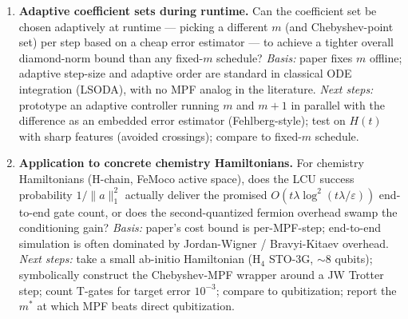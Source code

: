 \begin{enumerate}
  \item \textbf{Adaptive coefficient sets during runtime.} Can the coefficient set be chosen adaptively at runtime --- picking a different $m$ (and Chebyshev-point set) per step based on a cheap error estimator --- to achieve a tighter overall diamond-norm bound than any fixed-$m$ schedule? \emph{Basis:} paper fixes $m$ offline; adaptive step-size and adaptive order are standard in classical ODE integration (LSODA), with no MPF analog in the literature. \emph{Next steps:} prototype an adaptive controller running $m$ and $m+1$ in parallel with the difference as an embedded error estimator (Fehlberg-style); test on $H(t)$ with sharp features (avoided crossings); compare to fixed-$m$ schedule.
  \item \textbf{Application to concrete chemistry Hamiltonians.} For chemistry Hamiltonians (H-chain, FeMoco active space), does the LCU success probability $1/\|a\|_1^2$ actually deliver the promised $O(t\lambda \log^2(t\lambda/\varepsilon))$ end-to-end gate count, or does the second-quantized fermion overhead swamp the conditioning gain? \emph{Basis:} paper's cost bound is per-MPF-step; end-to-end simulation is often dominated by Jordan-Wigner / Bravyi-Kitaev overhead. \emph{Next steps:} take a small ab-initio Hamiltonian (H$_4$ STO-3G, $\sim 8$ qubits); symbolically construct the Chebyshev-MPF wrapper around a JW Trotter step; count T-gates for target error $10^{-3}$; compare to qubitization; report the $m^*$ at which MPF beats direct qubitization.
\end{enumerate}
